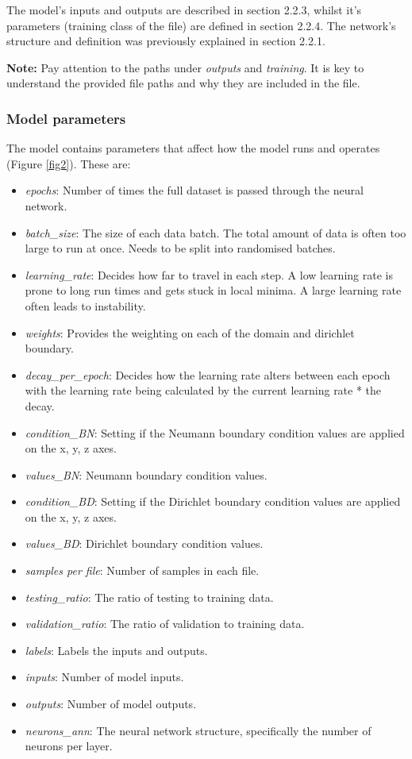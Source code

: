 \documentclass[11pt]{article}
\providecommand{\tightlist}{%
      \setlength{\itemsep}{0pt}\setlength{\parskip}{0pt}}
\begin{document}
The model's inputs and outputs are described in section 2.2.3, whilst it's parameters (training class of the file) are defined in section 2.2.4. The network's structure and definition was previously explained in section 2.2.1. 

\textbf{Note:} Pay attention to the paths under \textit{outputs} and \textit{training}. It is key to understand the provided file paths and why they are included in the file. 

\subsubsection{Model parameters}
The model contains parameters that affect how the model runs and
operates (Figure \ref{fig2}). These are:

\begin{itemize}
\tightlist
\item
  \textit{epochs}: Number of times the full dataset is passed through the neural
  network.
\item
  \textit{batch\_size}: The size of each data batch. The total amount of data
  is often too large to run at once. Needs to be split into randomised batches.
\item
  \textit{learning\_rate}: Decides how far to travel in each step. A low
  learning rate is prone to long run times and gets stuck in
  local minima. A large learning rate often leads to instability.
\item
  \textit{weights}: Provides the weighting on each of the domain and dirichlet boundary.
\item
  \textit{decay\_per\_epoch}: Decides how the learning rate alters between each
  epoch with the learning rate being calculated by the current learning
  rate * the decay.
\item
  \textit{condition\_BN}: Setting if the Neumann boundary condition values are applied on the x, y, z axes.
\item
  \textit{values\_BN}: Neumann boundary condition values. 
\item
  \textit{condition\_BD}: Setting if the Dirichlet boundary condition values are applied on the x, y, z axes.
\item
  \textit{values\_BD}: Dirichlet boundary condition values. 
\item
  \textit{samples per file}: Number of samples in each file.
\item
  \textit{testing\_ratio}: The ratio of testing to training data.
\item
  \textit{validation\_ratio}: The ratio of validation to training data.
\item
  \textit{labels}: Labels the inputs and outputs.
\item
  \textit{inputs}: Number of model inputs.
\item
  \textit{outputs}: Number of model outputs.
\item
  \textit{neurons\_ann}: The neural network structure, specifically the number of neurons per layer.
\end{itemize}
\end{document}
